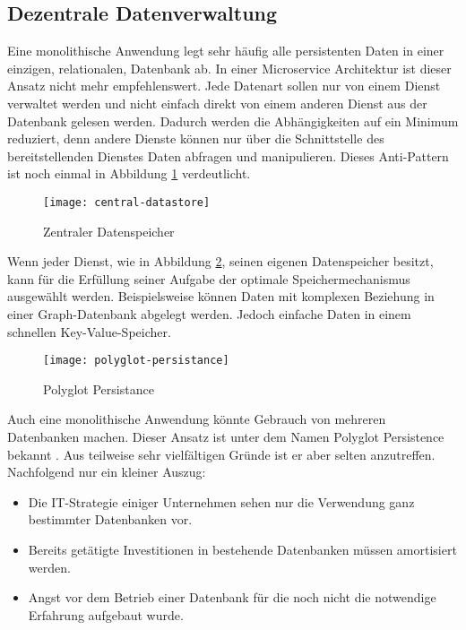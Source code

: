 \subsection{Dezentrale Datenverwaltung}

Eine monolithische Anwendung legt sehr häufig alle persistenten Daten in einer einzigen, \zB relationalen, Datenbank ab. In einer Microservice Architektur ist dieser Ansatz nicht mehr empfehlenswert. Jede Datenart sollen nur von einem Dienst verwaltet werden und nicht einfach direkt von einem anderen Dienst aus der Datenbank gelesen werden. Dadurch werden die Abhängigkeiten auf ein Minimum reduziert, denn andere Dienste können nur über die Schnittstelle des bereitstellenden Dienstes Daten abfragen und manipulieren. Dieses Anti-Pattern ist noch einmal in Abbildung \ref{fig:central-datastore} verdeutlicht.

\begin{figure}[h]
  \centering
	\texttt{[image: central-datastore]}
	\caption{Zentraler Datenspeicher}
	\label{fig:central-datastore}
\end{figure}

Wenn jeder Dienst, wie in Abbildung \ref{fig:polyglot-persistnace}, seinen eigenen Datenspeicher besitzt, kann für die Erfüllung seiner Aufgabe der optimale Speichermechanismus ausgewählt werden. Beispielsweise können Daten mit komplexen Beziehung in einer Graph-Datenbank abgelegt werden. Jedoch einfache Daten in einem schnellen Key-Value-Speicher.

\begin{figure}[h]
  \centering
	\texttt{[image: polyglot-persistance]}
	\caption{Polyglot Persistance}
	\label{fig:polyglot-persistnace}
\end{figure}

Auch eine monolithische Anwendung könnte Gebrauch von mehreren Datenbanken machen. Dieser Ansatz ist unter dem Namen Polyglot Persistence bekannt \cite{FowlerPP}. Aus teilweise sehr vielfältigen Gründe ist er aber selten anzutreffen. Nachfolgend nur ein kleiner Auszug:

\begin{itemize}
  \item Die IT-Strategie einiger Unternehmen sehen nur die Verwendung ganz bestimmter Datenbanken vor.
	\item Bereits getätigte Investitionen in bestehende Datenbanken müssen amortisiert werden.
	\item Angst vor dem Betrieb einer Datenbank für die noch nicht die notwendige Erfahrung aufgebaut wurde.
\end{itemize}

